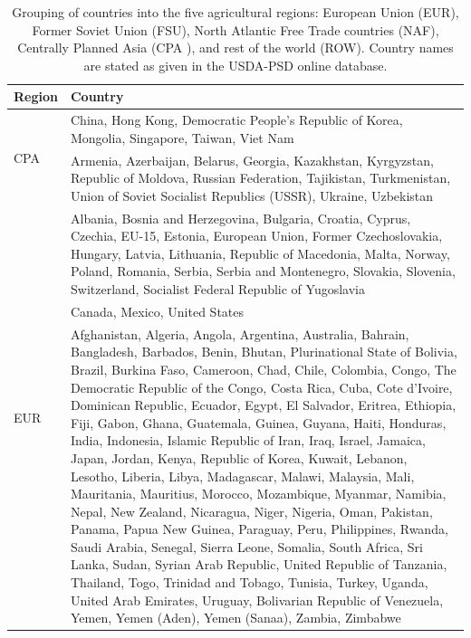 \begin{table}[htbp]
  \caption{Grouping of countries into the five agricultural regions: European Union (EUR), Former Soviet Union (FSU), North Atlantic Free Trade countries (NAF), Centrally Planned Asia (CPA ), and rest of the world (ROW). Country names are stated as given in the USDA-PSD online database.}
  \label{tab:conGroup}
  \centering
    \begin{tabularx}{\textwidth}{lX}
      Region & Country\\
      \toprule
      \multirow{2}{*}{CPA} & China, Hong Kong, Democratic People's Republic of Korea, Mongolia, Singapore, Taiwan, Viet Nam\\
      \midrule
      \multirow{3}{*}{FSU} & Armenia, Azerbaijan, Belarus, Georgia, Kazakhstan, Kyrgyzstan, Republic of Moldova, Russian Federation, Tajikistan, Turkmenistan, Union of Soviet Socialist Republics (USSR), Ukraine, Uzbekistan\\
      \midrule
      \multirow{4}{*}{EUR} & Albania, Bosnia and Herzegovina, Bulgaria, Croatia, Cyprus, Czechia, EU-15, Estonia, European Union, Former Czechoslovakia, Hungary, Latvia, Lithuania, Republic of Macedonia, Malta, Norway, Poland, Romania,
        Serbia, Serbia and Montenegro, Slovakia, Slovenia, Switzerland, Socialist Federal Republic of Yugoslavia \\
      \midrule
            NAF & Canada, Mexico, United States\\
      \midrule
      \multirow{14}{*}{ROW}
             & Afghanistan, Algeria, Angola, Argentina, Australia, Bahrain, Bangladesh, Barbados, Benin, Bhutan, Plurinational State of Bolivia, Brazil, Burkina Faso, Cameroon, Chad, Chile, Colombia, Congo, The Democratic Republic of the Congo, Costa Rica, Cuba, Cote d'Ivoire, Dominican Republic, Ecuador, Egypt, El Salvador, Eritrea, Ethiopia, Fiji, Gabon, Ghana, Guatemala, Guinea, Guyana, Haiti, Honduras, India, Indonesia, Islamic Republic of Iran, Iraq, Israel, Jamaica, Japan, Jordan, Kenya, Republic of Korea, Kuwait, Lebanon, Lesotho, Liberia, Libya, Madagascar, Malawi, Malaysia, Mali, Mauritania, Mauritius, Morocco, Mozambique, Myanmar, Namibia, Nepal, New Zealand, Nicaragua, Niger, Nigeria, Oman, Pakistan, Panama, Papua New Guinea, Paraguay, Peru, Philippines, Rwanda, Saudi Arabia, Senegal, Sierra Leone, Somalia, South Africa, Sri Lanka, Sudan, Syrian Arab Republic, United Republic of Tanzania, Thailand, Togo, Trinidad and Tobago, Tunisia, Turkey, Uganda, United Arab Emirates, Uruguay, Bolivarian Republic of Venezuela, Yemen, Yemen (Aden), Yemen (Sanaa), Zambia, Zimbabwe\\
      \bottomrule
    \end{tabularx}
  \end{table}

